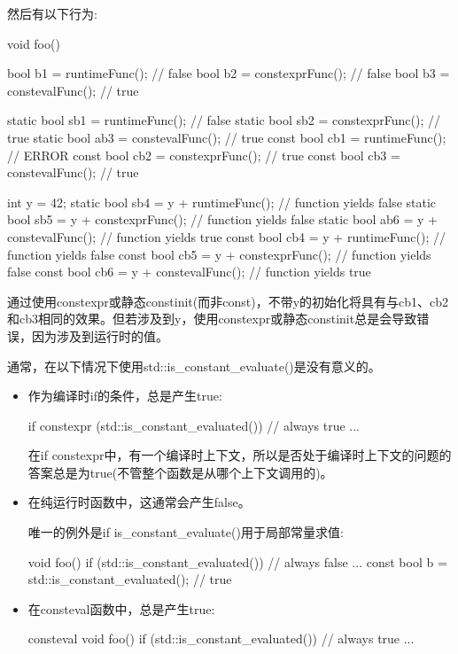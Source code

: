 然后有以下行为:

\begin{cpp}
void foo()
{
	bool b1 = runtimeFunc(); // false
	bool b2 = constexprFunc(); // false
	bool b3 = constevalFunc(); // true
	
	static bool sb1 = runtimeFunc(); // false
	static bool sb2 = constexprFunc(); // true
	static bool ab3 = constevalFunc(); // true
	const bool cb1 = runtimeFunc(); // ERROR
	const bool cb2 = constexprFunc(); // true
	const bool cb3 = constevalFunc(); // true
	
	int y = 42;
	static bool sb4 = y + runtimeFunc(); // function yields false
	static bool sb5 = y + constexprFunc(); // function yields false
	static bool ab6 = y + constevalFunc(); // function yields true
	const bool cb4 = y + runtimeFunc(); // function yields false
	const bool cb5 = y + constexprFunc(); // function yields false
	const bool cb6 = y + constevalFunc(); // function yields true
}
\end{cpp}

通过使用constexpr或静态constinit(而非const)，不带y的初始化将具有与cb1、cb2和cb3相同的效果。但若涉及到y，使用constexpr或静态constinit总是会导致错误，因为涉及到运行时的值。

通常，在以下情况下使用std::is\_constant\_evaluate()是没有意义的。

\begin{itemize}
\item 
作为编译时if的条件，总是产生true:

\begin{cpp}
if constexpr (std::is_constant_evaluated()) { // always true
	...
}
\end{cpp}

在if constexpr中，有一个编译时上下文，所以是否处于编译时上下文的问题的答案总是为true(不管整个函数是从哪个上下文调用的)。

\item 
在纯运行时函数中，这通常会产生false。

唯一的例外是if is\_constant\_evaluate()用于局部常量求值:

\begin{cpp}
void foo() {
	if (std::is_constant_evaluated()) { // always false
		...
	}
	const bool b = std::is_constant_evaluated(); // true
}
\end{cpp}

\item 
在consteval函数中，总是产生true:

\begin{cpp}
consteval void foo() {
	if (std::is_constant_evaluated()) { // always true
		...
	}
}
\end{cpp}

\end{itemize}

